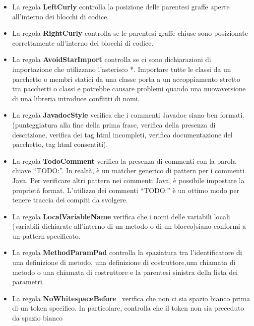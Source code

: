 	\begin{itemize}

		\item La regola \textbf{\textbf{LeftCurly}} controlla la posizione delle parentesi graffe aperte all’interno dei blocchi di codice.

		\item La regola \textbf{\textbf{RightCurly}} controlla se le parentesi graffe chiuse sono posizionate correttamente all’interno dei blocchi di codice.

		\item La regola \textbf{\textbf{AvoidStarImport}} controlla se ci sono dichiarazioni di importazione che utilizzano l’asterisco *. Importare tutte le classi da un pacchetto o membri statici da una classe porta a un accoppiamento stretto tra pacchetti o classi e potrebbe causare problemi quando una nuovaversione di una libreria introduce conflitti di nomi.

		\item La regola \textbf{\textbf{JavadocStyle}} verifica che i commenti Javadoc siano ben formati. (punteggiatura alla fine della prima frase, verifica della presenza di descrizione, verifica dei tag html incompleti, verifica documentazione del pacchetto, tag html consentiti).

		\item La regola \textbf{\textbf{TodoComment}} verifica la presenza di commenti con la parola chiave “TODO:”. In realtà, è un matcher generico di pattern per i commenti Java. Per verificare altri pattern nei commenti Java, è possibile impostare la proprietà format. L’utilizzo dei commenti “TODO:” è un ottimo modo per tenere traccia dei compiti da svolgere.

		\item La regola \textbf{\textbf{LocalVariableName}} verifica che i nomi delle variabili locali (variabili dichiarate all’interno di un metodo o di un blocco)siano conformi a un pattern specificato.

		\item La regola \textbf{\textbf{MethodParamPad}} controlla la spaziatura tra l’identificatore di una definizione di metodo, una definizione di costruttore,una chiamata di metodo o una chiamata di costruttore e la parentesi sinistra della lista dei parametri.

		\item La regola \textbf{\textbf{NoWhitespaceBefore}}  verifica che non ci sia spazio bianco prima di un token specifico. In particolare, controlla che il token non sia preceduto da spazio bianco


\end{itemize}
